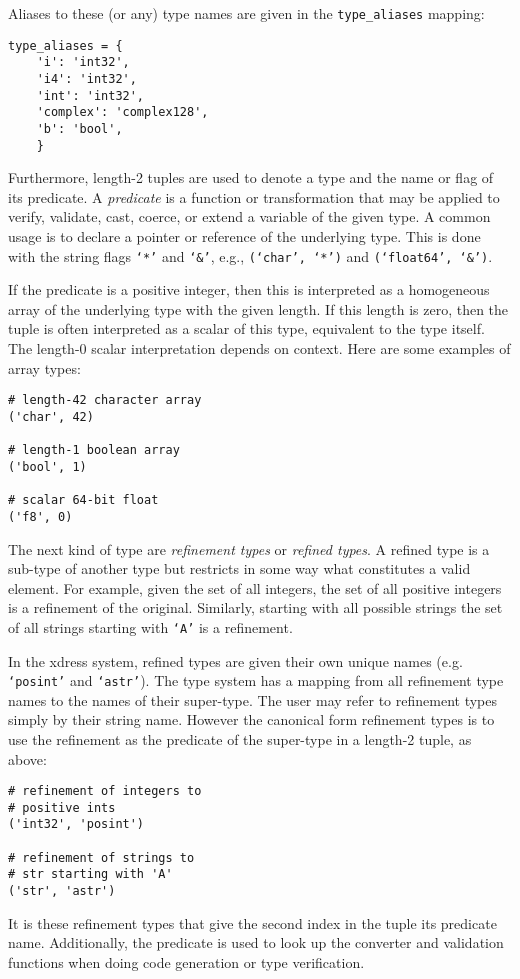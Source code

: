 \documentclass{ansconfpaper}
\newcommand{\vin}[1]{\texttt{{#1}}}
\begin{document}
Aliases to these (or any) type names are given in the \vin{type\_aliases} 
mapping:
\begin{lstlisting}
type_aliases = {
    'i': 'int32',
    'i4': 'int32',
    'int': 'int32',
    'complex': 'complex128',
    'b': 'bool',
    }
\end{lstlisting}

Furthermore, length-2 tuples are used to denote a type and the name or flag of its
predicate.  A \emph{predicate }is a function or transformation that may be applied to 
verify, validate, cast, coerce, or extend a variable of the given type.  A common 
usage is to declare a pointer or reference of the underlying type.  This is done with 
the string flags \vin{`*'} and \vin{`\&'}, e.g.,  \vin{(`char', `*')} and 
\vin{(`float64', `\&')}.

If the predicate is a positive integer, then this is interpreted as a 
homogeneous array of the underlying type with the given length.  If this length 
is zero, then the tuple is often interpreted as a scalar of this type, equivalent 
to the type itself.  The length-0 scalar interpretation depends on context.  Here 
are some examples of array types:
\begin{lstlisting}
# length-42 character array
('char', 42)  

# length-1 boolean array
('bool', 1)   

# scalar 64-bit float
('f8', 0)     
\end{lstlisting}

The next kind of type are \emph{refinement types} or \emph{refined types}.  
A refined type
is a sub-type of another type but restricts in some way what constitutes a valid 
element.  For example, given the set of all integers, the set of all positive 
integers is a refinement of the original.  Similarly, starting with all possible
strings the set of all strings starting with \vin{`A'} is a refinement.

In the xdress system, refined types are given their own unique names (e.g. 
\vin{`posint'} and \vin{`astr'}).  The type system has a mapping from all refinement
type names to the names of their super-type.  The user may refer to refinement types
simply by their string name.  However the canonical form refinement types is to use
the refinement as the predicate of the super-type in a length-2 tuple, as above:
\begin{lstlisting}
# refinement of integers to 
# positive ints
('int32', 'posint')

# refinement of strings to 
# str starting with 'A'
('str', 'astr')      
\end{lstlisting}
It is these refinement types that give the second index in the tuple its predicate
name.  Additionally, the predicate is used to look up the converter and validation
functions when doing code generation or type verification.
\end{document}
